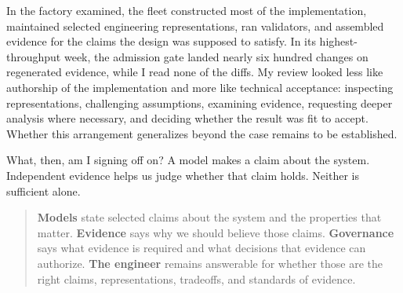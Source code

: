 
In the factory  examined, the fleet constructed most of the implementation, maintained selected engineering representations, ran validators, and assembled evidence for the claims the design was supposed to satisfy. In its highest-throughput week, the admission gate landed nearly six hundred changes on regenerated evidence, while I read none of the diffs. My review looked less like authorship of the implementation and more like technical acceptance: inspecting representations, challenging assumptions, examining evidence, requesting deeper analysis where necessary, and deciding whether the result was fit to accept. Whether this arrangement generalizes beyond the case remains to be established.


What, then, am I signing off on? A model makes a claim about the system. Independent evidence helps us judge whether that claim holds. Neither is sufficient alone.



\begin{quote}
\textbf{Models} state selected claims about the system and the properties that matter. \textbf{Evidence} says why we should believe those claims. \textbf{Governance} says what evidence is required and what decisions that evidence can authorize. \textbf{The engineer} remains answerable for whether those are the right claims, representations, tradeoffs, and standards of evidence.
\end{quote}


